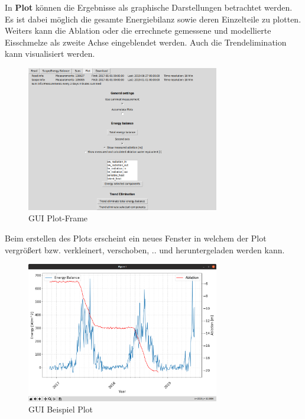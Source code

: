 \documentclass[12pt,a4paper]{article}
\newcommand{\guiplotsize}{0.75}
\begin{document}
In \textbf{Plot} können die Ergebnisse als graphische Darstellungen betrachtet werden. Es ist dabei möglich die gesamte Energiebilanz sowie deren Einzelteile zu plotten. Weiters kann die Ablation oder die errechnete gemessene und modellierte Eisschmelze als zweite Achse eingeblendet werden. Auch die Trendelimination kann visualisiert werden.

\begin{figure}[H]
\centering
\includegraphics[width=\guiplotsize\textwidth]{pictures/GUI/Plot_Frame.png}
\caption{GUI Plot-Frame}
\label{fig:GUI Plot-Frame}
\end{figure}

Beim erstellen des Plots erscheint ein neues Fenster in welchem der Plot vergrößert bzw. verkleinert, verschoben, .. und heruntergeladen werden kann.

\begin{figure}[H]
\centering
\includegraphics[width=\guiplotsize\textwidth]{pictures/GUI/Sample_Plot.png}
\caption{GUI Beispiel Plot}
\label{fig:GUI Beispiel Plot}
\end{figure}
\end{document}
